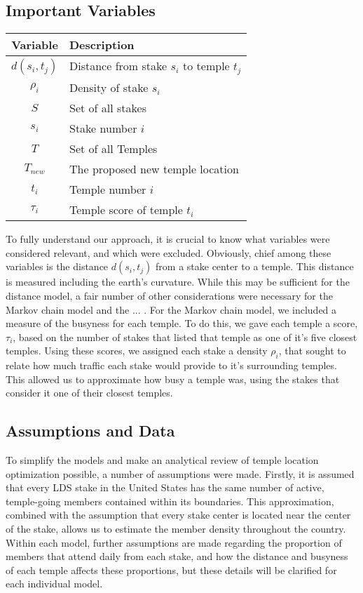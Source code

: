 \documentclass[twoside,twocolumn]{article}
\begin{document}
\subsection{Important Variables}
\begin{tabular}{c | l}
Variable & Description\\
\hline
$d(s_{i},t_{j})$ & Distance from stake $s_{i}$ to temple $t_{j}$\\
$\rho_{i}$ & Density of stake $s_{i}$\\
$S$ & Set of all stakes\\
$s_{i}$ & Stake number $i$\\
$T$ & Set of all Temples\\
$T_{new}$ & The proposed new temple location\\
$t_{i}$ & Temple number $i$ \\
$\tau_{i}$ & Temple score of temple $t_{i}$\\
\end{tabular}
\vspace{0.1in}

\noindent To fully understand our approach, it is crucial to know what variables were considered relevant, and which were excluded.
Obviously, chief among these variables is the distance $d(s_{i},t_{j})$ from a stake center to a temple.
This distance is measured including the earth's curvature.
While this may be sufficient for the distance model, a fair number of other considerations were necessary for the Markov chain model and the ... .
For the Markov chain model, we included a measure of the busyness for each temple.
To do this, we gave each temple a score, $\tau_{i}$, based on the number of stakes that listed that temple as one of it's five closest temples.
Using these scores, we assigned each stake a density $\rho_{i}$, that sought to relate how much traffic each stake would provide to it's surrounding temples.
This allowed us to approximate how busy a temple was, using the stakes that consider it one of their closest temples.

\subsection{Assumptions and Data}
To simplify the models and make an analytical review of temple location optimization possible, a number of assumptions were made. Firstly, it is assumed that every LDS stake in the United States has the same number of active, temple-going members contained within its boundaries. This approximation, combined with the assumption that every stake center is located near the center of the stake, allows us to estimate the member density throughout the country. Within each model, further assumptions are made regarding the proportion of members that attend daily from each stake, and how the distance and busyness of each temple affects these proportions, but these details will be clarified for each individual model.
\end{document}
